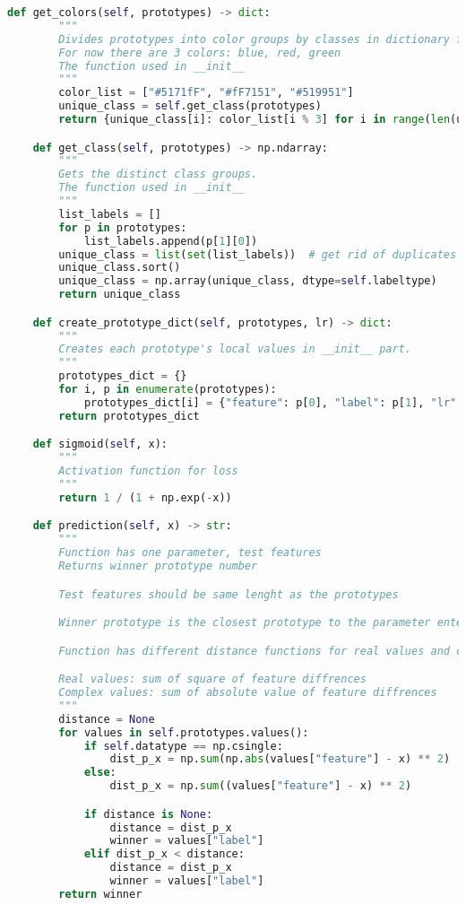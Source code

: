 \begin{lstlisting}[language=Python]
    def get_colors(self, prototypes) -> dict:
        """
        Divides prototypes into color groups by classes in dictionary form
        For now there are 3 colors: blue, red, green
        The function used in __init__
        """
        color_list = ["#5171fF", "#fF7151", "#519951"]
        unique_class = self.get_class(prototypes)
        return {unique_class[i]: color_list[i % 3] for i in range(len(unique_class))}

    def get_class(self, prototypes) -> np.ndarray:
        """
        Gets the distinct class groups.
        The function used in __init__
        """
        list_labels = []
        for p in prototypes:
            list_labels.append(p[1][0])
        unique_class = list(set(list_labels))  # get rid of duplicates
        unique_class.sort()
        unique_class = np.array(unique_class, dtype=self.labeltype)
        return unique_class

    def create_prototype_dict(self, prototypes, lr) -> dict:
        """
        Creates each prototype's local values in __init__ part.
        """
        prototypes_dict = {}
        for i, p in enumerate(prototypes):
            prototypes_dict[i] = {"feature": p[0], "label": p[1], "lr": lr}
        return prototypes_dict

    def sigmoid(self, x):
        """
        Activation function for loss
        """
        return 1 / (1 + np.exp(-x))

    def prediction(self, x) -> str:
        """
        Function has one parameter, test features
        Returns winner prototype number

        Test features should be same lenght as the prototypes

        Winner prototype is the closest prototype to the parameter entered

        Function has different distance functions for real values and complex values

        Real values: sum of square of feature diffrences
        Complex values: sum of absolute value of feature diffrences
        """
        distance = None
        for values in self.prototypes.values():
            if self.datatype == np.csingle:
                dist_p_x = np.sum(np.abs(values["feature"] - x) ** 2)
            else:
                dist_p_x = np.sum((values["feature"] - x) ** 2)

            if distance is None:
                distance = dist_p_x
                winner = values["label"]
            elif dist_p_x < distance:
                distance = dist_p_x
                winner = values["label"]
        return winner


\end{lstlisting}
